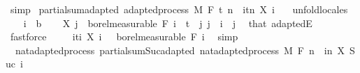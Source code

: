 \begin{isabellebody}
\ simp\isanewline
{}\isamarkupfalse%
%
\endisatagproof
{\isafoldproof}%
%
\isadelimproof
\isanewline
%
\endisadelimproof
\isanewline
{}\isamarkupfalse%
\ partial{\isacharunderscore}{\kern0pt}sum{\isacharprime}{\kern0pt}{\isacharunderscore}{\kern0pt}adapted{\isacharcolon}{\kern0pt}\ {\isachardoublequoteopen}adapted{\isacharunderscore}{\kern0pt}process\ M\ F\ t\ {\isacharparenleft}{\kern0pt}{\isasymlambda}n\ {\isasymxi}{\isachardot}{\kern0pt}\ {\isasymSum}i{\isasymin}{\isacharbraceleft}{\kern0pt}tn{\isacharbraceright}{\kern0pt}{\isachardot}{\kern0pt}\ X\ i\ {\isasymxi}{\isacharparenright}{\kern0pt}{\isachardoublequoteclose}\ \isanewline
%
\isadelimproof
%
\endisadelimproof
%
\isatagproof
{}\isamarkupfalse%
\ {\isacharparenleft}{\kern0pt}unfold{\isacharunderscore}{\kern0pt}locales{\isacharparenright}{\kern0pt}\isanewline
\ \ \isamarkupfalse%
\ i\ {\isacharcolon}{\kern0pt}{\isacharcolon}{\kern0pt}\ {\isacharprime}{\kern0pt}b\isanewline
\ \ \isamarkupfalse%
\ {\isachardoublequoteopen}X\ j\ {\isasymin}\ borel{\isacharunderscore}{\kern0pt}measurable\ {\isacharparenleft}{\kern0pt}F\ i{\isacharparenright}{\kern0pt}{\isachardoublequoteclose}\ \ {\isachardoublequoteopen}t\ {\isasymle}\ j{\isachardoublequoteclose}\ {\isachardoublequoteopen}j\ {\isacharless}{\kern0pt}\ i{\isachardoublequoteclose}\ \ j\ \isamarkupfalse%
\ that\ adaptedE\ \isamarkupfalse%
\ fastforce\isanewline
\ \ \isamarkupfalse%
\ {\isachardoublequoteopen}{\isacharparenleft}{\kern0pt}{\isasymlambda}{\isasymxi}{\isachardot}{\kern0pt}\ {\isasymSum}i{\isasymin}{\isacharbraceleft}{\kern0pt}ti{\isacharbraceright}{\kern0pt}{\isachardot}{\kern0pt}\ X\ i\ {\isasymxi}{\isacharparenright}{\kern0pt}\ {\isasymin}\ borel{\isacharunderscore}{\kern0pt}measurable\ {\isacharparenleft}{\kern0pt}F\ i{\isacharparenright}{\kern0pt}{\isachardoublequoteclose}\ \isamarkupfalse%
\ simp\isanewline
{}\isamarkupfalse%
%
\endisatagproof
{\isafoldproof}%
%
\isadelimproof
\isanewline
%
\endisadelimproof
\isanewline
{}\isamarkupfalse%
\isanewline
\isanewline
{}\isamarkupfalse%
\ {\isacharparenleft}{\kern0pt}\ nat{\isacharunderscore}{\kern0pt}adapted{\isacharunderscore}{\kern0pt}process{\isacharparenright}{\kern0pt}\ partial{\isacharunderscore}{\kern0pt}sum{\isacharunderscore}{\kern0pt}Suc{\isacharunderscore}{\kern0pt}adapted{\isacharcolon}{\kern0pt}\ {\isachardoublequoteopen}nat{\isacharunderscore}{\kern0pt}adapted{\isacharunderscore}{\kern0pt}process\ M\ F\ {\isacharparenleft}{\kern0pt}{\isasymlambda}n\ {\isasymxi}{\isachardot}{\kern0pt}\ {\isasymSum}i{\isacharless}{\kern0pt}n{\isachardot}{\kern0pt}\ X\ {\isacharparenleft}{\kern0pt}Suc\ i{\isacharparenright}{\kern0pt}\ {\isasymxi}{\isacharparenright}{\kern0pt}{\isachardoublequoteclose}\ \isanewline

\end{isabellebody}
